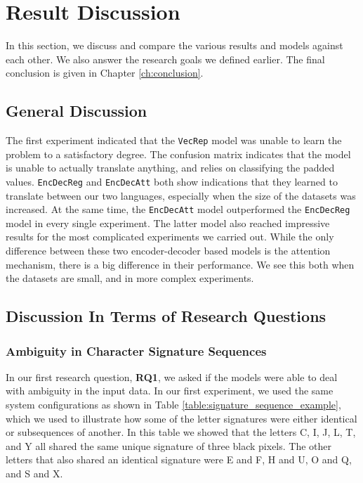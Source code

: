 
\section{Result Discussion}
\label{sec:result_discussion}
In this section, we discuss and compare the various results and models against each other. We also answer the research goals we defined earlier. The final conclusion is given in Chapter \ref{ch:conclusion}.

\subsection{General Discussion}
The first experiment indicated that the {\tt VecRep} model was unable to learn the problem to a satisfactory degree. The confusion matrix indicates that the model is unable to actually translate anything, and relies on classifying the padded values. {\tt EncDecReg} and {\tt EncDecAtt} both show indications that they learned to translate between our two languages, especially when the size of the datasets was increased. At the same time, the {\tt EncDecAtt} model outperformed the {\tt EncDecReg} model in every single experiment. The latter model also reached impressive results for the most complicated experiments we carried out. While the only difference between these two encoder-decoder based models is the attention mechanism, there is a big difference in their performance. We see this both when the datasets are small, and in more complex experiments.

\subsection{Discussion In Terms of Research Questions}

\subsubsection{Ambiguity in Character Signature Sequences}
In our first research question, \textbf{RQ1}, we asked if the models were able to deal with ambiguity in the input data. In our first experiment, we used the same system configurations as shown in Table \ref{table:signature_sequence_example}, which we used to illustrate how some of the letter signatures were either identical or subsequences of another. In this table we showed that the letters C, I, J, L, T, and Y all shared the same unique signature of three black pixels. The other letters that also shared an identical signature were E and F, H and U, O and Q, and S and X. 

